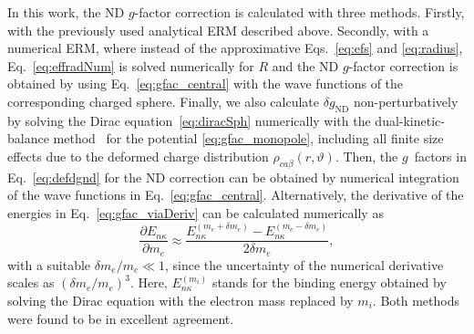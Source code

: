 In this work, the ND $g$-factor correction is calculated with three methods. 
Firstly, with the previously used analytical ERM described above. Secondly, with a numerical ERM, where instead of the approximative Eqs.~\eqref{eq:efs} and \eqref{eq:radius}, Eq.~\eqref{eq:effradNum} is solved numerically for $R$ and the ND $g$-factor correction is obtained by using Eq.~\eqref{eq:gfac_central} with the wave functions of the corresponding charged sphere.
Finally, we also calculate $\delta g_{\text{ND}}$ non-perturbatively by solving the Dirac equation~\eqref{eq:diracSph} numerically with the dual-kinetic-balance method~\cite{Shabaev2004} for the potential \eqref{eq:gfac_monopole}, including all finite size effects due to the deformed charge distribution $\rho_{ca\beta}(r,\vartheta)$. Then, the $g$~factors in Eq.~\eqref{eq:defdgnd} for the ND correction can be obtained by numerical integration of the wave functions in Eq.~\eqref{eq:gfac_central}. Alternatively, the derivative of the energies in Eq.~\eqref{eq:gfac_viaDeriv} can be calculated numerically as 
\begin{equation}
\frac{\partial E_{n\kappa}}{\partial m_e} \approx \frac{E_{n\kappa}^{(m_e+\delta m_e)}-E_{n\kappa}^{(m_e-\delta m_e)}}{2 \delta m_e},
\end{equation}
with a suitable ${\delta m_e / m_e}{\ll}{1}$, since the uncertainty of the numerical derivative scales as $(\delta m_e/m_e)^3$. Here, $E_{n\kappa}^{(m_i)}$ stands for the binding energy obtained by solving the Dirac equation with the electron mass replaced by $m_i$. Both methods were found to be in excellent agreement.


